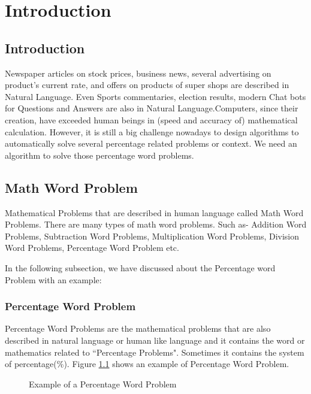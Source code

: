 \documentclass[document.tex]{subfiles}
\begin{document}
\chapter{Introduction}
\section{Introduction}
Newspaper articles on stock prices, business news, several advertising on product’s current rate, and offers on products of
super shops are described in Natural Language. Even Sports
commentaries, election results, modern Chat bots for Questions
and Answers are also in Natural Language.Computers, since their creation, have exceeded human beings in (speed and accuracy of) mathematical calculation. However, it is still a big challenge nowadays to design algorithms to automatically solve several percentage related problems or context. We need an algorithm to solve those percentage word problems.

\section{Math Word Problem}
\noindent Mathematical Problems that are described in human language called Math Word Problems. There are many types of math word problems. Such as- Addition Word Problems, Subtraction Word Problems, Multiplication Word Problems, Division Word Problems, Percentage Word Problem etc.

In the following subsection, we have discussed about the Percentage word Problem with an example:
\subsection{Percentage Word Problem}
\noindent Percentage Word Problems are the mathematical problems that are also described in natural language or human like language and it contains the word or mathematics related to ``Percentage Problems". Sometimes it contains the system of percentage(\%). Figure \ref{fig:a} shows an example of Percentage Word Problem.
\begin{figure}[H] 
	\caption{Example of a Percentage Word Problem}
	\label{fig:a}
\end{figure}
\end{document}
